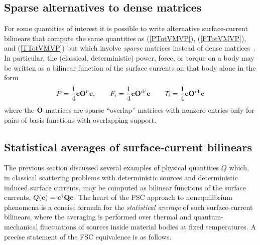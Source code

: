 \documentclass[letterpaper]{article}
\newcommand{\IF}{^{i\text{\scriptsize F}}}
\newcommand{\IT}{^{i\text{\scriptsize T}}}
\begin{document}
\subsection*{Sparse alternatives to dense matrices}

For some quantities of interest it is possible to write alternative
surface-current bilinears that compute the same quantities as 
(\ref{PTotVMVP}), (\ref{FTotVMVP}), and (\ref{TTotVMVP})
but which involve \textit{sparse} matrices instead of dense
matrices~\cite{Reid2013a}. In particular, the (classical, deterministic) 
power, force, or torque on a body may be written as a bilinear 
function of the surface currents on that body alone in the form
$$
 P = \frac{1}{4}\vb c \vb O\supt{P} \vb c, 
 \qquad
 F_i = \frac{1}{4}\vb c \vb O\IF \vb c
 \qquad
 \mc T_i = \frac{1}{4}\vb c \vb O\IT \vb c
$$
where the $\mathbf{O}$ matrices are sparse ``overlap'' matrices
with nonzero entries only for pairs of basis functions
with overlapping support.

\subsection{Statistical averages of surface-current bilinears}

The previous section discussed several examples of physical
quantities $Q$ which, in classical scattering problems with 
deterministic sources and deterministic induced surface 
currents, may be computed as bilinear functions of the surface 
currents, $ Q(\mathbf{c})=\mathbf{c}^\dagger \mathbf{Q} \mathbf{c}$. 
The heart of the FSC 
approach to nonequilibrium phenomena is a concise formula for 
the \textit{statistical average} of such surface-current bilinears,
where the averaging is performed over thermal and quantum-mechanical
fluctuations of sources inside material bodies at fixed temperatures.
A precise statement of the FSC equivalence is as follows.
\end{document}
